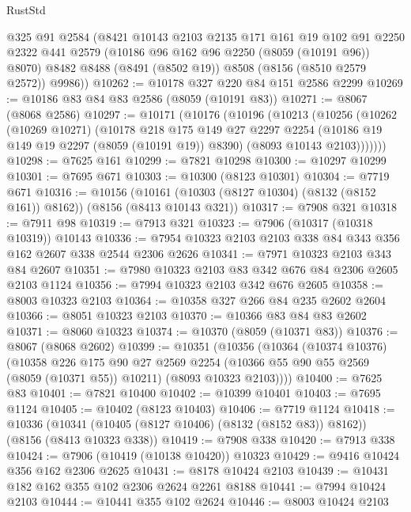 \begin{lexlean}{RustStd}
\begin{coremodule}
      @325
      @91
      @2584
      (@8421
        @10143
        @2103
        @2135
        @171
        @161
        @19
        @102
        @91
        @2250
        @2322
        @441
        @2579
        (@10186 @96 @162 @96 @2250 (@8059 (@10191 @96)) @8070)
        @8482
        @8488
        (@8491 (@8502 @19))
        @8508
        (@8156 (@8510 @2579 @2572))
        @9986))
@10262 := @10178 @327 @220 @84 @151 @2586 @2299
@10269 := @10186 @83 @84 @83 @2586 (@8059 (@10191 @83))
@10271 := @8067 (@8068 @2586)
@10297 := @10171
    (@10176
      (@10196
        (@10213
          (@10256
            (@10262
              (@10269 @10271)
              (@10178
                @218
                @175
                @149
                @27
                @2297
                @2254
                (@10186 @19 @149 @19 @2297 (@8059 (@10191 @19)) @8390)
                (@8093 @10143 @2103)))))))
@10298 := @7625 @161
@10299 := @7821 @10298
@10300 := @10297 @10299
@10301 := @7695 @671
@10303 := @10300 (@8123 @10301)
@10304 := @7719 @671
@10316 := @10156
    (@10161 (@10303 (@8127 @10304) (@8132 (@8152 @161)) @8162))
    (@8156 (@8413 @10143 @321))
@10317 := @7908 @321
@10318 := @7911 @98
@10319 := @7913 @321
@10323 := @7906 (@10317 (@10318 @10319)) @10143
@10336 := @7954 @10323 @2103 @2103 @338 @84 @343 @356 @162 @2607 @338 @2544 @2306 @2626
@10341 := @7971 @10323 @2103 @343 @84 @2607
@10351 := @7980 @10323 @2103 @83 @342 @676 @84 @2306 @2605 @2103 @1124
@10356 := @7994 @10323 @2103 @342 @676 @2605
@10358 := @8003 @10323 @2103
@10364 := @10358 @327 @266 @84 @235 @2602 @2604
@10366 := @8051 @10323 @2103
@10370 := @10366 @83 @84 @83 @2602
@10371 := @8060 @10323
@10374 := @10370 (@8059 (@10371 @83))
@10376 := @8067 (@8068 @2602)
@10399 := @10351
    (@10356
      (@10364
        (@10374 @10376)
        (@10358
          @226
          @175
          @90
          @27
          @2569
          @2254
          (@10366 @55 @90 @55 @2569 (@8059 (@10371 @55)) @10211)
          (@8093 @10323 @2103))))
@10400 := @7625 @83
@10401 := @7821 @10400
@10402 := @10399 @10401
@10403 := @7695 @1124
@10405 := @10402 (@8123 @10403)
@10406 := @7719 @1124
@10418 := @10336
    (@10341 (@10405 (@8127 @10406) (@8132 (@8152 @83)) @8162))
    (@8156 (@8413 @10323 @338))
@10419 := @7908 @338
@10420 := @7913 @338
@10424 := @7906 (@10419 (@10138 @10420)) @10323
@10429 := @9416 @10424 @356 @162 @2306 @2625
@10431 := @8178 @10424 @2103
@10439 := @10431 @182 @162 @355 @102 @2306 @2624 @2261 @8188
@10441 := @7994 @10424 @2103
@10444 := @10441 @355 @102 @2624
@10446 := @8003 @10424 @2103

\end{coremodule}
\end{lexlean}
